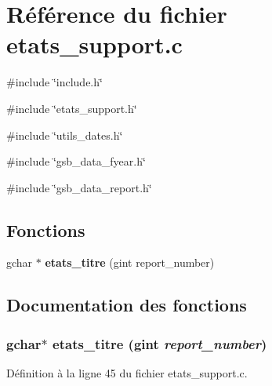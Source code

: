 \section{Référence du fichier etats\_\-support.c}
\label{etats__support_8c}
{\ttfamily \#include \char`\"{}include.h\char`\"{}}\par
{\ttfamily \#include \char`\"{}etats\_\-support.h\char`\"{}}\par
{\ttfamily \#include \char`\"{}utils\_\-dates.h\char`\"{}}\par
{\ttfamily \#include \char`\"{}gsb\_\-data\_\-fyear.h\char`\"{}}\par
{\ttfamily \#include \char`\"{}gsb\_\-data\_\-report.h\char`\"{}}\par
\subsection*{Fonctions}
\begin{DoxyCompactItemize}
\item 
gchar $\ast$ {\bf etats\_\-titre} (gint report\_\-number)
\end{DoxyCompactItemize}


\subsection{Documentation des fonctions}
\subsubsection[{etats\_\-titre}]{\setlength{\rightskip}{0pt plus 5cm}gchar$\ast$ etats\_\-titre (gint {\em report\_\-number})}\label{etats__support_8c_afebb1d8c6e6cc8825f96e411d2b9e618}


Définition à la ligne 45 du fichier etats\_\-support.c.

